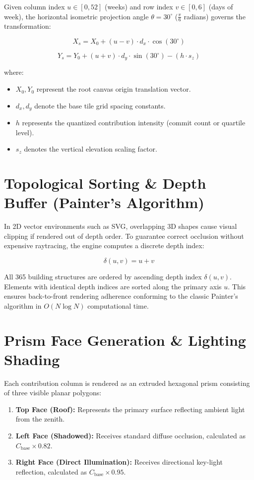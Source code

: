\documentclass[12pt,a4paper]{report}
\begin{document}
Given column index $u \in [0, 52]$ (weeks) and row index $v \in [0, 6]$ (days of week), the horizontal isometric projection angle $\theta = 30^\circ$ ($\frac{\pi}{6}$ radians) governs the transformation:

\begin{equation}
X_s = X_0 + (u - v) \cdot d_x \cdot \cos(30^\circ)
\end{equation}

\begin{equation}
Y_s = Y_0 + (u + v) \cdot d_y \cdot \sin(30^\circ) - (h \cdot s_z)
\end{equation}

where:
\begin{itemize}
    \item $X_0, Y_0$ represent the root canvas origin translation vector.
    \item $d_x, d_y$ denote the base tile grid spacing constants.
    \item $h$ represents the quantized contribution intensity (commit count or quartile level).
    \item $s_z$ denotes the vertical elevation scaling factor.
\end{itemize}

\section{Topological Sorting \& Depth Buffer (Painter's Algorithm)}
In 2D vector environments such as SVG, overlapping 3D shapes cause visual clipping if rendered out of depth order. To guarantee correct occlusion without expensive raytracing, the engine computes a discrete depth index:

\begin{equation}
\delta(u, v) = u + v
\end{equation}

All 365 building structures are ordered by ascending depth index $\delta(u, v)$. Elements with identical depth indices are sorted along the primary axis $u$. This ensures back-to-front rendering adherence conforming to the classic Painter's algorithm in $O(N \log N)$ computational time.

\section{Prism Face Generation \& Lighting Shading}
Each contribution column is rendered as an extruded hexagonal prism consisting of three visible planar polygons:
\begin{enumerate}
    \item \textbf{Top Face (Roof):} Represents the primary surface reflecting ambient light from the zenith.
    \item \textbf{Left Face (Shadowed):} Receives standard diffuse occlusion, calculated as $C_{\text{base}} \times 0.82$.
    \item \textbf{Right Face (Direct Illumination):} Receives directional key-light reflection, calculated as $C_{\text{base}} \times 0.95$.
\end{enumerate}
\end{document}
